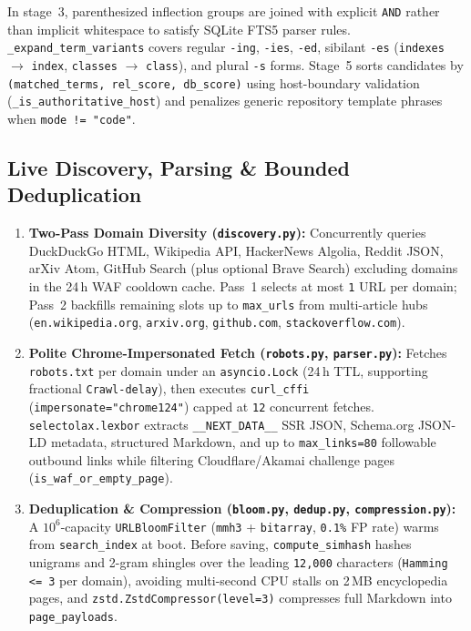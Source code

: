\documentclass[10pt,a4paper]{article}
\begin{document}
In stage~3, parenthesized inflection groups are joined with explicit \texttt{\texttt{AND}} rather than implicit whitespace to satisfy SQLite FTS5 parser rules. \texttt{\_expand\_term\_variants} covers regular \texttt{-ing}, \texttt{-ies}, \texttt{-ed}, sibilant \texttt{-es} (\texttt{indexes} $\to$ \texttt{index}, \texttt{classes} $\to$ \texttt{class}), and plural \texttt{-s} forms. Stage~5 sorts candidates by \texttt{(matched\_terms, rel\_score, db\_score)} using host-boundary validation (\texttt{\_is\_authoritative\_host}) and penalizes generic repository template phrases when \texttt{mode != "code"}.

\subsection{Live Discovery, Parsing \& Bounded Deduplication}
\begin{enumerate}[leftmargin=1.4em, itemsep=3pt]
    \item \textbf{Two-Pass Domain Diversity (\texttt{discovery.py}):} Concurrently queries DuckDuckGo HTML, Wikipedia API, HackerNews Algolia, Reddit JSON, arXiv Atom, GitHub Search (plus optional Brave Search) excluding domains in the 24\,h WAF cooldown cache. Pass~1 selects at most \texttt{1} URL per domain; Pass~2 backfills remaining slots up to \texttt{max\_urls} from multi-article hubs (\texttt{en.wikipedia.org}, \texttt{arxiv.org}, \texttt{github.com}, \texttt{stackoverflow.com}).
    \item \textbf{Polite Chrome-Impersonated Fetch (\texttt{robots.py}, \texttt{parser.py}):} Fetches \texttt{robots.txt} per domain under an \texttt{asyncio.Lock} (24\,h TTL, supporting fractional \texttt{Crawl-delay}), then executes \texttt{curl\_cffi} (\texttt{impersonate="chrome124"}) capped at \texttt{12} concurrent fetches. \texttt{selectolax.lexbor} extracts \texttt{\_\_NEXT\_DATA\_\_} SSR JSON, Schema.org JSON-LD metadata, structured Markdown, and up to \texttt{max\_links=80} followable outbound links while filtering Cloudflare/Akamai challenge pages (\texttt{is\_waf\_or\_empty\_page}).
    \item \textbf{Deduplication \& Compression (\texttt{bloom.py}, \texttt{dedup.py}, \texttt{compression.py}):} A $10^6$-capacity \texttt{URLBloomFilter} (\texttt{mmh3} + \texttt{bitarray}, \texttt{0.1\%} FP rate) warms from \texttt{search\_index} at boot. Before saving, \texttt{compute\_simhash} hashes unigrams and 2-gram shingles over the leading \texttt{12,000} characters (\texttt{Hamming <= 3} per domain), avoiding multi-second CPU stalls on 2\,MB encyclopedia pages, and \texttt{zstd.ZstdCompressor(level=3)} compresses full Markdown into \texttt{page\_payloads}.
\end{enumerate}
\end{document}
